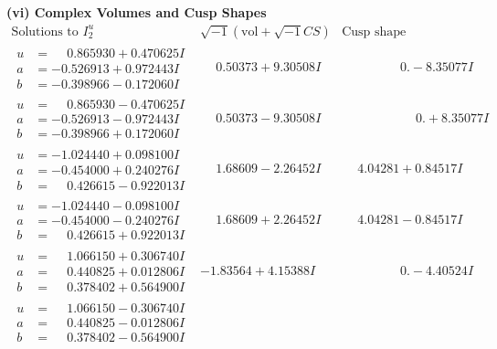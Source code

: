 \documentclass[1p]{elsarticle_modified}
\theoremstyle{definition}
\newcommand{\I}{\sqrt{-1}}
\begin{document}
\newpage\flushleft \textbf{(vi) Complex Volumes and Cusp Shapes}
$$\begin{array}{c|c|c}  
\text{Solutions to }I^u_{2}& \I (\text{vol} + \sqrt{-1}CS) & \text{Cusp shape}\\
 \hline 
\begin{aligned}
u &= \phantom{-}0.865930 + 0.470625 I \\
a &= -0.526913 + 0.972443 I \\
b &= -0.398966 - 0.172060 I\end{aligned}
 & \phantom{-}0.50373 + 9.30508 I & \phantom{-0.000000 } 0. - 8.35077 I \\ \hline\begin{aligned}
u &= \phantom{-}0.865930 - 0.470625 I \\
a &= -0.526913 - 0.972443 I \\
b &= -0.398966 + 0.172060 I\end{aligned}
 & \phantom{-}0.50373 - 9.30508 I & \phantom{-0.000000 -}0. + 8.35077 I \\ \hline\begin{aligned}
u &= -1.024440 + 0.098100 I \\
a &= -0.454000 + 0.240276 I \\
b &= \phantom{-}0.426615 - 0.922013 I\end{aligned}
 & \phantom{-}1.68609 - 2.26452 I & \phantom{-}4.04281 + 0.84517 I \\ \hline\begin{aligned}
u &= -1.024440 - 0.098100 I \\
a &= -0.454000 - 0.240276 I \\
b &= \phantom{-}0.426615 + 0.922013 I\end{aligned}
 & \phantom{-}1.68609 + 2.26452 I & \phantom{-}4.04281 - 0.84517 I \\ \hline\begin{aligned}
u &= \phantom{-}1.066150 + 0.306740 I \\
a &= \phantom{-}0.440825 + 0.012806 I \\
b &= \phantom{-}0.378402 + 0.564900 I\end{aligned}
 & -1.83564 + 4.15388 I & \phantom{-0.000000 } 0. - 4.40524 I \\ \hline\begin{aligned}
u &= \phantom{-}1.066150 - 0.306740 I \\
a &= \phantom{-}0.440825 - 0.012806 I \\
b &= \phantom{-}0.378402 - 0.564900 I\end{aligned}

\end{array}$$
\end{document}
